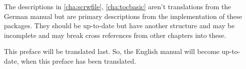 The descriptions in \autoref{cha:scrwfile}, \autoref{cha:tocbasic} aren't
translations from the German manual but are primary descriptions from the
implementation of these packages. They should be up-to-date but have another
structure and may be incomplete and may break cross references from other
chapters into these.

This preface will be translated last. So, the English manual will become
up-to-date, when this preface has been translated.

\endinput



